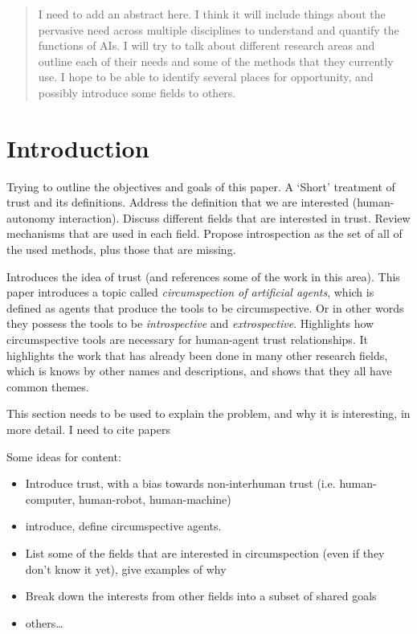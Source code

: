 \maketitle

\begin{abstract}
    I need to add an abstract here. I think it will include things about the pervasive need across multiple disciplines to understand and quantify the functions of AIs. I will try to talk about different research areas and outline each of their needs and some of the methods that they currently  use. I hope to be able to identify several places for opportunity, and possibly introduce some fields to others.
\end{abstract}

\section{Introduction}
    Trying to outline the objectives and goals of this paper. A `Short' treatment of trust and its definitions. Address the definition that we are interested (human-autonomy interaction). Discuss different fields that are interested in trust. Review mechanisms that are used in each field. Propose introspection as the set of all of the used methods, plus those that are missing.
    
    Introduces the idea of trust (and references some of the work in this area). This paper introduces a topic called \emph{circumspection of artificial agents}, which is defined as agents that produce the tools to be circumspective. Or in other words they possess the tools to be \emph{introspective} and \emph{extrospective}. Highlights how circumspective tools are necessary for human-agent trust relationships. It highlights the work that has already been done in many other research fields, which is knows by other names and descriptions, and shows that they all have common themes.

    This section needs to be used to explain the problem, and why it is interesting, in more detail. I need to cite papers \cite{Back1996-jp,Ernest2016}

    Some ideas for content:

    \begin{itemize}
        \item Introduce trust, with a bias towards non-interhuman trust (i.e. human-computer, human-robot, human-machine)
        \item introduce, define circumspective agents.
        \item List some of the fields that are interested in circumspection (even if they don't know it yet), give examples of why
        \item Break down the interests from other fields into a subset of shared goals
        \item others\ldots
    \end{itemize}

